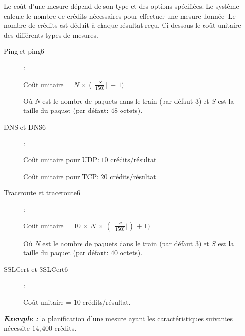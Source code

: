 Le coût d'une  mesure dépend de son type et des options spécifiées. Le système calcule le nombre de crédits nécessaires pour effectuer une mesure donnée. Le nombre de crédits est déduit à chaque résultat reçu.  Ci-dessous le coût unitaire des différents types de mesures.
\begin{description}
	\item[Ping et ping6 ]  :
	\begin{tcolorbox}
		\begin{center}
			Coût unitaire = $N$ $\times$ ($\lfloor \frac{S}{1500} \rfloor $ $+$ $1)$
		\end{center}
	\end{tcolorbox}
	Où $N$ est le nombre de paquets dans le train (par défaut $3$) et $S$ est la taille du paquet (par défaut: $48$ octets).
	\item[DNS et DNS6 ] :
	\begin{tcolorbox}
		\begin{center}
			Coût unitaire pour UDP: $10$ crédits/résultat
			
			Coût unitaire pour TCP: $20$ crédits/résultat
		\end{center}
	\end{tcolorbox}
	\item[Traceroute et traceroute6 ] :
	
	\begin{tcolorbox}
		\begin{center}
			Coût unitaire = $10$ $\times$ $N$ $\times$ $(\lfloor \frac{S}{1500}\rfloor)$ $+$ $1)$
		\end{center}
	\end{tcolorbox}
	
	Où $N$ est le nombre de paquets dans le train (par défaut $3$) et $S$ est la taille du paquet (par défaut: $40$ octets).
	\item[SSLCert et SSLCert6 ] :
	\begin{tcolorbox}
		\begin{center}
			Coût unitaire = $10$ crédits/résultat.
		\end{center}
	\end{tcolorbox}	
\end{description}
\textbf{\textit{Exemple :}} la planification d'une mesure ayant les caractéristiques suivantes nécessite $14,400$ crédits.

